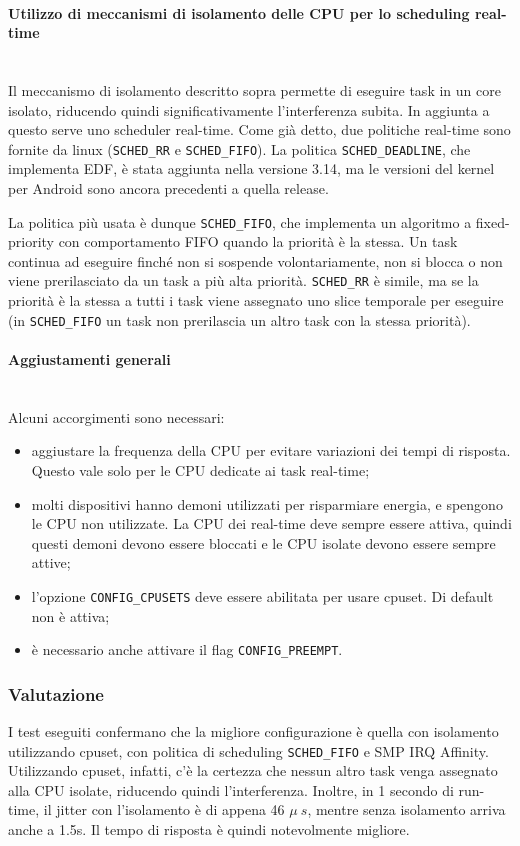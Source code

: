 \paragraph{Utilizzo di meccanismi di isolamento delle CPU per lo scheduling real-time} \mbox{} \\
Il meccanismo di isolamento descritto sopra permette di eseguire task in un core isolato, riducendo quindi significativamente l'interferenza subita. In aggiunta a questo serve uno scheduler real-time. Come già detto, due politiche real-time sono fornite da linux (\texttt{SCHED\_RR} e \texttt{SCHED\_FIFO}). La politica \texttt{SCHED\_DEADLINE}, che implementa EDF, è stata aggiunta nella versione 3.14, ma le versioni del kernel per Android sono ancora precedenti a quella release.

La politica più usata è dunque \texttt{SCHED\_FIFO}, che implementa un algoritmo a fixed-priority con comportamento FIFO quando la priorità è la stessa. Un task continua ad eseguire finché non si sospende volontariamente, non si blocca o non viene prerilasciato da un task a più alta priorità. \texttt{SCHED\_RR} è simile, ma se la priorità è la stessa a tutti i task viene assegnato uno slice temporale per eseguire (in \texttt{SCHED\_FIFO} un task non prerilascia un altro task con la stessa priorità).

\paragraph{Aggiustamenti generali} \mbox{} \\
Alcuni accorgimenti sono necessari:
\begin{itemize}
	\item aggiustare la frequenza della CPU per evitare variazioni dei tempi di risposta. Questo vale solo per le CPU dedicate ai task real-time;
	\item molti dispositivi hanno demoni utilizzati per risparmiare energia, e spengono le CPU non utilizzate. La CPU dei real-time deve sempre essere attiva, quindi questi demoni devono essere bloccati e le CPU isolate devono essere sempre attive;
	\item l'opzione \texttt{CONFIG\_CPUSETS} deve essere abilitata per usare cpuset. Di default non è attiva;
	\item è necessario anche attivare il flag \texttt{CONFIG\_PREEMPT}.
\end{itemize}

\subsubsection{Valutazione}
I test eseguiti confermano che la migliore configurazione è quella con isolamento utilizzando cpuset, con politica di scheduling \texttt{SCHED\_FIFO} e SMP IRQ Affinity. Utilizzando cpuset, infatti, c'è la certezza che nessun altro task venga assegnato alla CPU isolate, riducendo quindi l'interferenza. Inoltre, in 1 secondo di run-time, il jitter con l'isolamento è di appena 46 $\mu~s$, mentre senza isolamento arriva anche a 1.5s. Il tempo di risposta è quindi notevolmente migliore.

